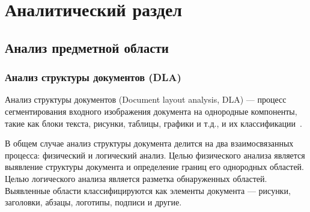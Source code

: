 \section{Аналитический раздел}




\subsection{Анализ предметной области}


\subsubsection{Анализ структуры документов (DLA)}

Анализ структуры документов (Document layout analysis, DLA) --- процесс сегментирования входного изображения документа на однородные компоненты, такие как блоки текста, рисунки, таблицы, графики и т.д., и их классификации~\cite{tnt}.

В общем случае анализ структуры документа делится на два взаимосвязанных процесса: физический и логический анализ.
Целью физического анализа является выявление структуры документа и определение границ его однородных областей.
Целью логического анализа является разметка обнаруженных областей. Выявленные области классифицируются как элементы документа --- рисунки, заголовки, абзацы, логотипы, подписи и другие.~\cite{dla-survey}

